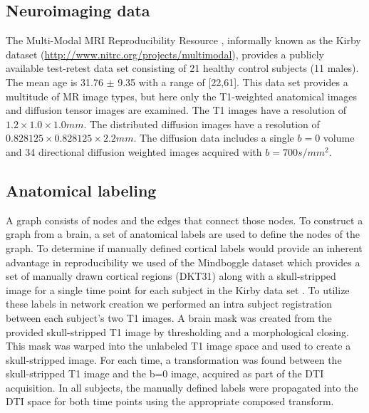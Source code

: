 \documentclass{frontiersSCNS} %
\begin{document}
\subsection{Neuroimaging data}
The Multi-Modal MRI Reproducibility Resource \citep{Landman2011},
informally known as the Kirby dataset (\url{http://www.nitrc.org/projects/multimodal}), 
provides a publicly available test-retest data set consisting of 21
healthy control subjects (11 males). The mean
age is 31.76 $\pm$ 9.35 with a range of [22,61]. This data set provides a
multitude of MR image types, but here only the T1-weighted anatomical images and diffusion
tensor images are examined. The T1 images have a resolution of
$1.2 \times 1.0 \times 1.0 mm$. The distributed diffusion images have a resolution of
$0.828125 \times 0.828125 \times 2.2mm$. The diffusion data includes a single $b=0$
volume and 34 directional diffusion weighted images acquired with
$b=700 s/mm^2$. 

\subsection{Anatomical labeling}
A graph consists of nodes and the edges that connect those nodes. To construct a graph from a brain, a set of anatomical labels
are used to define the nodes of the graph. To determine if manually defined cortical labels would provide an inherent advantage in
reproducibility we used of the Mindboggle dataset which provides a set of manually drawn cortical regions (DKT31) 
along with a skull-stripped image for a single time point for each subject in the Kirby data set \citep{Klein2012}. 
To utilize these labels in network creation we performed an intra subject registration between each subject's two T1 images. 
A brain mask was created from the provided skull-stripped T1 image by thresholding and a morphological closing. This mask
was warped into the unlabeled T1 image space and used to create a skull-stripped image. For each time, a transformation was found
between the skull-stripped T1 image and the b=0 image, acquired as part of the DTI acquisition. In all subjects, the manually defined
labels were propagated into the DTI space for both time points using the appropriate composed transform. 
\end{document}
